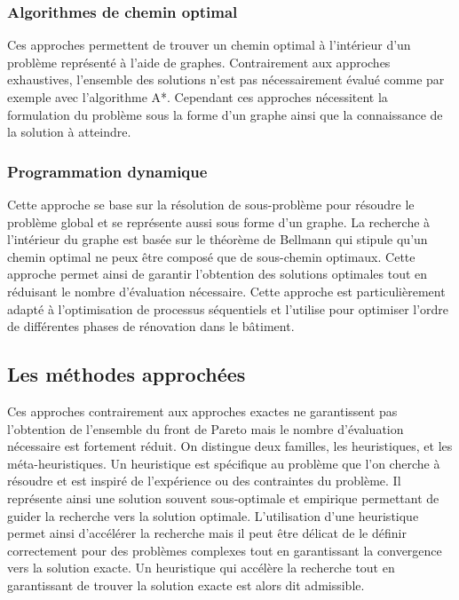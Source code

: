 \subsubsection{Algorithmes de chemin optimal} %
\label{ssub:algorithmes_de_chemin_optimal}
Ces approches permettent de trouver un chemin optimal à l’intérieur d’un problème
représenté à l’aide de graphes. Contrairement aux approches exhaustives, l’ensemble
des solutions n’est pas nécessairement évalué comme par exemple avec l’algorithme
A*. Cependant ces approches nécessitent la formulation du problème sous la forme d’un
graphe ainsi que la connaissance de la solution à atteindre.


\subsubsection{Programmation dynamique} %
\label{ssub:programmation_dynamique}
Cette approche se base sur la résolution de sous-problème pour résoudre le problème global
et se représente aussi sous forme d’un graphe. La recherche à l’intérieur du graphe est basée
sur le théorème de Bellmann qui stipule qu’un chemin optimal ne peux être composé
que de sous-chemin optimaux. Cette approche permet ainsi de garantir l’obtention
des solutions optimales tout en réduisant le nombre d’évaluation nécessaire.
Cette approche est particulièrement adapté à l’optimisation de processus séquentiels
et \cite{Rivallain2013} l’utilise pour optimiser l’ordre de différentes phases
de rénovation dans le bâtiment.




\subsection{Les méthodes approchées} %
\label{sub:les_methodes_approchees}
Ces approches contrairement aux approches exactes ne garantissent pas l’obtention
de l’ensemble du front de Pareto mais le nombre d’évaluation nécessaire est fortement
réduit. On distingue deux familles, les heuristiques, et les méta-heuristiques.
Un heuristique est spécifique au problème que l’on cherche à résoudre et est
inspiré de l’expérience ou des contraintes du problème. Il représente ainsi une
solution souvent sous-optimale et empirique permettant de guider la recherche
vers la solution optimale. L’utilisation d’une heuristique permet ainsi d’accélérer
la recherche mais il peut être délicat de le définir correctement pour des problèmes
complexes tout en garantissant la convergence vers la solution exacte. Un heuristique
qui accélère la recherche tout en garantissant de trouver la solution exacte est alors
dit admissible.

